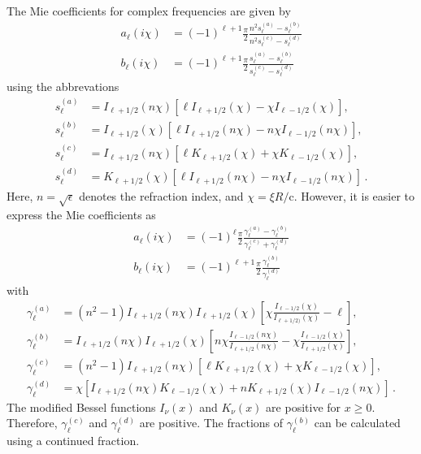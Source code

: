 \documentclass[superscriptaddress,prb]{revtex4-1}
\newcommand{\imag}{i} %
\newcommand{\sol}{\mathrm{c}} %
\begin{document}
The Mie coefficients for complex frequencies are given by
\begin{align}
a_\ell(\imag\chi) &= (-1)^{\ell+1} \frac{\pi}{2} \frac{n^2 s_\ell^{(a)} - s_\ell^{(b)}}{n^2 s_\ell^{(c)} - s_\ell^{(d)}} \\
b_\ell(\imag\chi) &= (-1)^{\ell+1} \frac{\pi}{2} \frac{s_\ell^{(a)} - s_\ell^{(b)}}{s_\ell^{(c)} - s_\ell^{(d)}}
\end{align}
using the abbrevations
\begin{align}
s_\ell^{(a)} &= I_{\ell+1/2}(n\chi) \left[\ell I_{\ell+1/2}(\chi)  -  \chi I_{\ell-1/2}(\chi) \right], \\
s_\ell^{(b)} &= I_{\ell+1/2}(\chi)  \left[\ell I_{\ell+1/2}(n\chi) - n\chi I_{\ell-1/2}(n\chi)\right], \\
s_\ell^{(c)} &= I_{\ell+1/2}(n\chi) \left[\ell K_{\ell+1/2}(\chi)  +  \chi K_{\ell-1/2}(\chi) \right], \\
s_\ell^{(d)} &= K_{\ell+1/2}(\chi)  \left[\ell I_{\ell+1/2}(n\chi) - n\chi I_{\ell-1/2}(n\chi)\right] \,.
\end{align}
Here, $n=\sqrt{\epsilon}$ denotes the refraction index, and $\chi=\xi R/\sol$. However, it is easier to express
the Mie coefficients as
\begin{align}
a_\ell(\imag\chi) &= (-1)^\ell \frac{\pi}{2} \frac{\gamma^{(a)}_\ell-\gamma^{(b)}_\ell}{\gamma^{(c)}_\ell+\gamma^{(d)}_\ell} \\
b_\ell(\imag\chi) &= (-1)^{\ell+1} \frac{\pi}{2} \frac{\gamma^{(b)}_\ell}{\gamma^{(d)}_\ell}
\end{align}
with
\begin{align}
\gamma_\ell^{(a)} &= (n^2-1) I_{\ell+1/2}(n\chi) I_{\ell+1/2}(\chi) \left[\chi \frac{I_{\ell-1/2}(\chi)}{I_{\ell+1/2)}(\chi)} - \ell\right], \\
\gamma_\ell^{(b)} &= I_{\ell+1/2}(n\chi) I_{\ell+1/2}(\chi) \left[n\chi\frac{I_{\ell-1/2}(n\chi)}{I_{\ell+1/2}(n\chi)}-\chi\frac{I_{\ell-1/2}(\chi)}{I_{\ell+1/2}(\chi)}\right], \\
\gamma_\ell^{(c)} &= (n^2-1) I_{\ell+1/2}(n\chi) \left[\ell K_{\ell+1/2}(\chi) + \chi K_{\ell-1/2}(\chi)\right], \\
\gamma_\ell^{(d)} &= \chi \left[I_{\ell+1/2}(n\chi) K_{\ell-1/2}(\chi) + n K_{\ell+1/2}(\chi) I_{\ell-1/2}(n\chi)\right] \,.
\end{align}
The modified Bessel functions $I_\nu(x)$ and $K_\nu(x)$ are positive for $x \ge
0$. Therefore, $\gamma_\ell^{(c)}$ and $\gamma_\ell^{(d)}$ are positive.
The fractions of $\gamma_\ell^{(b)}$ can be calculated using a continued
fraction.
\end{document}
